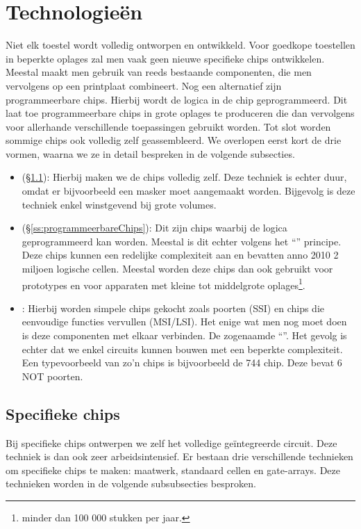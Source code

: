 \section{Technologie\"en}
Niet elk toestel wordt volledig ontworpen en ontwikkeld. Voor goedkope toestellen in beperkte oplages zal men vaak geen nieuwe specifieke chips ontwikkelen. Meestal maakt men gebruik van reeds bestaande componenten, die men vervolgens op een printplaat combineert. Nog een alternatief zijn programmeerbare chips. Hierbij wordt de logica in de chip geprogrammeerd. Dit laat toe programmeerbare chips in grote oplages te produceren die dan vervolgens voor allerhande verschillende toepassingen gebruikt worden. Tot slot worden sommige chips ook volledig zelf geassembleerd. We overlopen eerst kort de drie vormen, waarna we ze in detail bespreken in de volgende subsecties.
\begin{itemize}
 \item {} (\S\ref{ss:specifiekeChips}): Hierbij maken we de chips volledig zelf. Deze techniek is echter duur, omdat er bijvoorbeeld een masker moet aangemaakt worden. Bijgevolg is deze techniek enkel winstgevend bij grote volumes.
 \item {} (\S\ref{ss:programmeerbareChips}): Dit zijn chips waarbij de logica geprogrammeerd kan worden. Meestal is dit echter volgens het ``'' principe. Deze chips kunnen een redelijke complexiteit aan en bevatten anno 2010 2 miljoen logische cellen. Meestal worden deze chips dan ook gebruikt voor prototypes en voor apparaten met kleine tot middelgrote oplages\footnote{minder dan 100 000 stukken per jaar.}.
 \item {}: Hierbij worden simpele chips gekocht zoals poorten (SSI) en chips die eenvoudige functies vervullen (MSI/LSI). Het enige wat men nog moet doen is deze componenten met elkaar verbinden. De zogenaamde ``''. Het gevolg is echter dat we enkel circuits kunnen bouwen met een beperkte complexiteit. Een typevoorbeeld van zo'n chips is bijvoorbeeld de 744 chip. Deze bevat 6 NOT poorten.
\end{itemize}
\subsection{Specifieke chips}
\label{ss:specifiekeChips}
Bij specifieke chips ontwerpen we zelf het volledige ge\"integreerde circuit. Deze techniek is dan ook zeer arbeidsintensief. Er bestaan drie verschillende technieken om specifieke chips te maken: maatwerk, standaard cellen en gate-arrays. Deze technieken worden in de volgende subsubsecties besproken.
